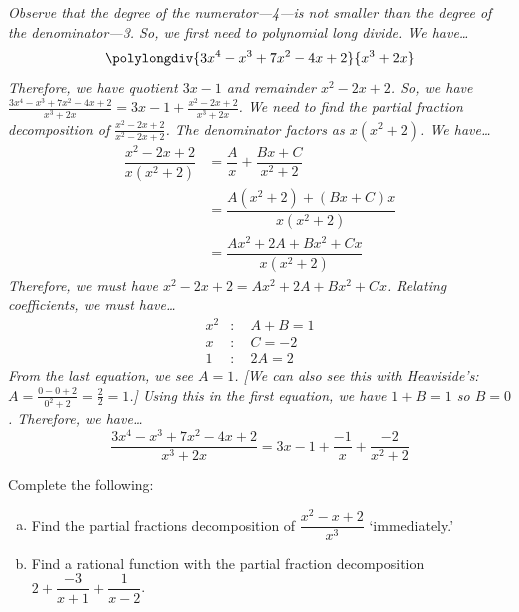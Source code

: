 \documentclass[11pt,letterpaper]{article}
\begin{document}
 {\itshape Observe that the degree of the numerator---4---is not smaller than the degree of the denominator---3. So, we first need to polynomial long divide. We have\dots
	\[
	\polylongdiv{3x^4 - x^3 + 7x^2 - 4x + 2}{x^3 + 2x}
	\]
Therefore, we have quotient $3x - 1$ and remainder $x^2 - 2x + 2$. So, we have $\tfrac{3x^4 - x^3 + 7x^2 - 4x + 2}{x^3 + 2x}= 3x - 1 + \tfrac{x^2 - 2x + 2}{x^3 + 2x}$. We need to find the partial fraction decomposition of $\tfrac{x^2 - 2x + 2}{x^2 - 2x + 2}$. The denominator factors as $x(x^2 + 2)$. We have\dots
	\[
	\begin{aligned}
	\dfrac{x^2 - 2x + 2}{x(x^2 + 2)}&= \dfrac{A}{x} + \dfrac{Bx + C}{x^2 + 2} \\[0.3cm]
	&= \dfrac{A(x^2 + 2) + (Bx + C)x}{x(x^2 + 2)} \\[0.3cm]
	&= \dfrac{Ax^2 + 2A + Bx^2 + Cx}{x(x^2 + 2)}
	\end{aligned}
	\]
Therefore, we must have $x^2 - 2x + 2= Ax^2 + 2A + Bx^2 + Cx$. Relating coefficients, we must have\dots
	\[
	\begin{aligned}
	x^2 &\colon\quad A + B= 1 \\
	x &\colon\quad C= -2 \\
	1 &\colon\quad 2A= 2
	\end{aligned}
	\]
From the last equation, we see $A= 1$. [We can also see this with Heaviside's: $A= \tfrac{0 - 0 + 2}{0^2 + 2}= \tfrac{2}{2}= 1$.] Using this in the first equation, we have $1 + B= 1$ so $B= 0$. Therefore, we have\dots
	\[
	\boxed{\dfrac{3x^4 - x^3 + 7x^2 - 4x + 2}{x^3 + 2x}= 3x - 1 + \dfrac{-1}{x} + \dfrac{-2}{x^2 + 2}}
	\]
}



\newpage



 Complete the following:
	\begin{enumerate}[(a)]
	\item Find the partial fractions decomposition of $\dfrac{x^2 - x + 2}{x^3}$ `immediately.' 
	\item Find a rational function with the partial fraction decomposition $2 + \dfrac{-3}{x + 1} + \dfrac{1}{x - 2}$.
	\end{enumerate} \par\vspace{0.3cm}

\end{document}

